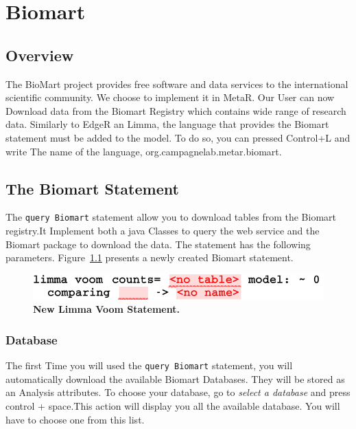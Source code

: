 

\chapter{Biomart}\label{chap:Biomart}

\section{Overview}
The BioMart project provides free software and data services to the international scientific community. We choose to implement it in MetaR. Our User can now Download data from the Biomart Registry which contains  wide range of research data. Similarly to EdgeR an Limma, the language that provides the Biomart statement must be added to the model. To do so, you can pressed Control+L and write The name of the language, org.campagnelab.metar.biomart.
\section{The Biomart Statement}
The \texttt{query Biomart} statement allow you to download tables from the Biomart registry.It Implement both a java Classes to query the web service and the Biomart package to download the data. The statement has the following parameters. Figure~\ref{fig:NewLimmaVoom} presents a newly created Biomart statement.

 \begin{figure}[h!tbp]
  \centering
  \includegraphics[width=\figWidthWide]{figures/NewLimmaVoom.pdf}
\caption[New Limma Voom Statement.]{\textbf{New Limma Voom Statement.}}
\label{fig:NewLimmaVoom}
\end{figure}


\subsection{Database}
The first Time you will used the \texttt{query Biomart} statement, you will automatically download the available Biomart Databases. They will be stored as an Analysis attributes. To choose your database, go to \textit{select a database} and press control + space.This action will display you all the available database. You will have to choose one from this list. 
